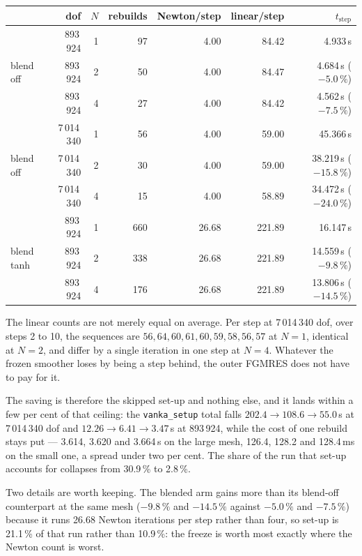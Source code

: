 \documentclass[11pt,a4paper]{article}
\newcommand{\code}[1]{\texttt{\small #1}}
\begin{document}
\begin{center}
\small
\begin{tabular}{@{}lrrrrrr@{}}
\toprule
& dof & $N$ & rebuilds & Newton/step & linear/step & $t_{\text{step}}$ \\
\midrule
\multirow{3}{*}{blend off}
 & 893\,924   & 1 &  97 &  4.00 &  84.42 & 4.933\,s \\
 & 893\,924   & 2 &  50 &  4.00 &  84.47 & 4.684\,s \;($-5.0\,\%$) \\
 & 893\,924   & 4 &  27 &  4.00 &  84.42 & 4.562\,s \;($-7.5\,\%$) \\
\midrule
\multirow{3}{*}{blend off}
 & 7\,014\,340 & 1 &  56 &  4.00 &  59.00 & 45.366\,s \\
 & 7\,014\,340 & 2 &  30 &  4.00 &  59.00 & 38.219\,s \;($-15.8\,\%$) \\
 & 7\,014\,340 & 4 &  15 &  4.00 &  58.89 & 34.472\,s \;($-24.0\,\%$) \\
\midrule
\multirow{3}{*}{blend tanh}
 & 893\,924   & 1 & 660 & 26.68 & 221.89 & 16.147\,s \\
 & 893\,924   & 2 & 338 & 26.68 & 221.89 & 14.559\,s \;($-9.8\,\%$) \\
 & 893\,924   & 4 & 176 & 26.68 & 221.89 & 13.806\,s \;($-14.5\,\%$) \\
\bottomrule
\end{tabular}
\end{center}

The linear counts are not merely equal on average. Per step at 7\,014\,340 dof, over steps 2 to
10, the sequences are $56,64,60,61,60,59,58,56,57$ at $N=1$, identical at $N=2$, and differ by a
single iteration in one step at $N=4$. Whatever the frozen smoother loses by being a step behind,
the outer FGMRES does not have to pay for it.

The saving is therefore the skipped set-up and nothing else, and it lands within a few per cent of
that ceiling: the \code{vanka\_setup} total falls $202.4 \to 108.6 \to 55.0$\,s at 7\,014\,340 dof
and $12.26 \to 6.41 \to 3.47$\,s at 893\,924, while the cost of one rebuild stays put --- 3.614,
3.620 and 3.664\,s on the large mesh, 126.4, 128.2 and 128.4\,ms on the small one, a spread under
two per cent. The share of the run that set-up accounts for collapses from 30.9\,\% to 2.8\,\%.

Two details are worth keeping. The blended arm gains more than its blend-off counterpart at the
same mesh ($-9.8\,\%$ and $-14.5\,\%$ against $-5.0\,\%$ and $-7.5\,\%$) because it runs 26.68
Newton iterations per step rather than four, so set-up is 21.1\,\% of that run rather than
10.9\,\%: the freeze is worth most exactly where the Newton count is worst.
\end{document}
